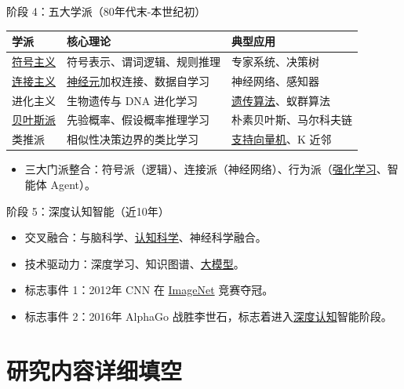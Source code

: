 \documentclass[11pt,a4paper]{ctexrep}
\newcommand{\fillblank}[1]{\underline{\hspace{2em}#1\hspace{2em}}}
\begin{document}
\begin{qbox}{阶段 4：五大学派（80年代末-本世纪初）}
    \begin{table}[h]
        \centering
        \small
        \begin{tabular}{@{}lll@{}}
            \toprule
            学派 & 核心理论 & 典型应用 \\
            \midrule
            \fillblank{符号主义} & 符号表示、谓词逻辑、规则推理 & 专家系统、决策树 \\
            \fillblank{连接主义} & \fillblank{神经元}加权连接、数据自学习 & 神经网络、感知器 \\
            进化主义 & 生物遗传与 DNA 进化学习 & \fillblank{遗传算法}、蚁群算法 \\
            \fillblank{贝叶斯派} & 先验概率、假设概率推理学习 & 朴素贝叶斯、马尔科夫链 \\
            类推派 & 相似性决策边界的类比学习 & \fillblank{支持向量机}、K 近邻 \\
            \bottomrule
        \end{tabular}
    \end{table}
    \begin{itemize}
        \item 三大门派整合：符号派（逻辑）、连接派（神经网络）、行为派（\fillblank{强化学习}、智能体 Agent）。
    \end{itemize}
\end{qbox}

\begin{qbox}{阶段 5：深度认知智能（近10年）}
    \begin{itemize}
        \item 交叉融合：与脑科学、\fillblank{认知科学}、神经科学融合。
        \item 技术驱动力：深度学习、知识图谱、\fillblank{大模型}。
        \item 标志事件 1：2012年 CNN 在 \fillblank{ImageNet} 竞赛夺冠。
        \item 标志事件 2：2016年 AlphaGo 战胜李世石，标志着进入\fillblank{深度认知}智能阶段。
    \end{itemize}
\end{qbox}

\chapter{研究内容详细填空}
\end{document}
